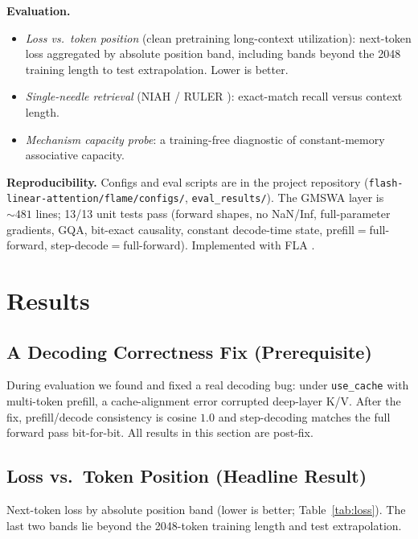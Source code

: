 \documentclass[letterpaper]{article} %
\begin{document}
\textbf{Evaluation.}
\begin{itemize}
  \item \emph{Loss vs.\ token position} (clean pretraining long-context utilization): next-token loss aggregated by absolute position band, including bands beyond the 2048 training length to test extrapolation. Lower is better.
  \item \emph{Single-needle retrieval} (NIAH / RULER \citep{ruler2024}): exact-match recall versus context length.
  \item \emph{Mechanism capacity probe}: a training-free diagnostic of constant-memory associative capacity.
\end{itemize}

\textbf{Reproducibility.} Configs and eval scripts are in the project repository (\texttt{flash-linear-attention/flame/configs/}, \texttt{eval\_results/}). The GMSWA layer is ${\sim}481$ lines; 13/13 unit tests pass (forward shapes, no NaN/Inf, full-parameter gradients, GQA, bit-exact causality, constant decode-time state, prefill$=$full-forward, step-decode$=$full-forward). Implemented with FLA \citep{fla}.

\section{Results}

\subsection{A Decoding Correctness Fix (Prerequisite)}
During evaluation we found and fixed a real decoding bug: under \texttt{use\_cache} with multi-token prefill, a cache-alignment error corrupted deep-layer K/V. After the fix, prefill/decode consistency is cosine $1.0$ and step-decoding matches the full forward pass bit-for-bit. All results in this section are post-fix.

\subsection{Loss vs.\ Token Position (Headline Result)}
Next-token loss by absolute position band (lower is better; Table~\ref{tab:loss}). The last two bands lie beyond the 2048-token training length and test extrapolation.
\end{document}
